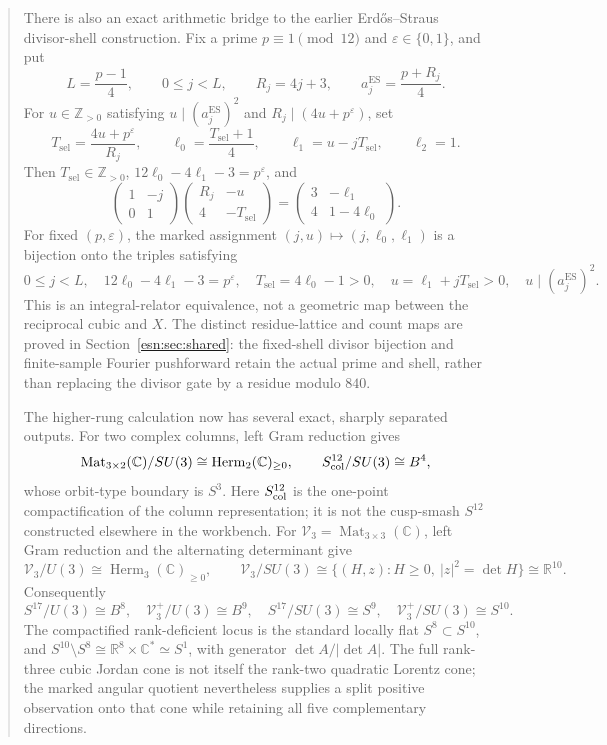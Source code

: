 \documentclass[11pt,letterpaper]{article}
\theoremstyle{definition}
\theoremstyle{remark}
\begin{document}
\begin{abstract}
 There is also an exact arithmetic bridge to the earlier
 Erd\H{o}s--Straus divisor-shell construction.  Fix a prime
 \(p\equiv1\pmod{12}\) and \(\varepsilon\in\{0,1\}\), and put
 \[
  L=\frac{p-1}{4},\qquad 0\leq j<L,\qquad R_j=4j+3,
  \qquad a_j^{\mathrm{ES}}=\frac{p+R_j}{4}.
 \]
 For \(u\in\mathbb Z_{>0}\) satisfying
 \(u\mid(a_j^{\mathrm{ES}})^2\) and
 \(R_j\mid(4u+p^\varepsilon)\), set
 \[
  T_{\mathrm{sel}}=\frac{4u+p^\varepsilon}{R_j},\qquad
  \ell_0=\frac{T_{\mathrm{sel}}+1}{4},\qquad
  \ell_1=u-jT_{\mathrm{sel}},\qquad \ell_2=1.
 \]
 Then \(T_{\mathrm{sel}}\in\mathbb Z_{>0}\),
 \(12\ell_0-4\ell_1-3=p^\varepsilon\), and
 \[
  \begin{pmatrix}1&-j\\0&1\end{pmatrix}
  \begin{pmatrix}R_j&-u\\4&-T_{\mathrm{sel}}\end{pmatrix}
  =\begin{pmatrix}3&-\ell_1\\4&1-4\ell_0\end{pmatrix}.
 \]
 For fixed \((p,\varepsilon)\), the marked assignment \((j,u)\mapsto
 (j,\ell_0,\ell_1)\) is a bijection onto the triples satisfying
 \[
  0\leq j<L,\quad12\ell_0-4\ell_1-3=p^\varepsilon,\quad
  T_{\mathrm{sel}}=4\ell_0-1>0,\quad
  u=\ell_1+jT_{\mathrm{sel}}>0,\quad
  u\mid(a_j^{\mathrm{ES}})^2.
 \]
 This is an integral-relator equivalence, not a geometric map between the
 reciprocal cubic and \(X\).
 The distinct residue-lattice and count maps are proved in
 Section~\ref{esn:sec:shared}: the fixed-shell divisor bijection and
 finite-sample Fourier pushforward retain the actual prime and shell,
 rather than replacing the divisor gate by a residue modulo $840$.

 The higher-rung calculation now has several exact, sharply separated outputs.
 For two complex columns, left Gram reduction gives
 \[
  \operatorname{Mat}_{3\times2}(\mathbb C)/SU(3)
  \cong\operatorname{Herm}_2(\mathbb C)_{\geq0},\qquad
  S^{12}_{\rm col}/SU(3)\cong B^4,
 \]
 whose orbit-type boundary is \(S^3\).  Here \(S^{12}_{\rm col}\) is the
 one-point compactification of the column representation; it is not the
 cusp-smash \(S^{12}\) constructed elsewhere in the workbench.
 For \(\mathscr V_3=\operatorname{Mat}_{3\times3}(\mathbb C)\), left Gram
 reduction and the alternating determinant give
 \[
  \mathscr V_3/U(3)\cong\operatorname{Herm}_3(\mathbb C)_{\geq0},
  \qquad
  \mathscr V_3/SU(3)
  \cong\{(H,z):H\geq0,\ |z|^2=\det H\}\cong\mathbb R^{10}.
 \]
 Consequently
 \[
  S^{17}/U(3)\cong B^8,\quad
  \mathscr V_3^+/U(3)\cong B^9,\quad
  S^{17}/SU(3)\cong S^9,\quad
  \mathscr V_3^+/SU(3)\cong S^{10}.
 \]
 The compactified rank-deficient locus is the standard locally flat
 \(S^8\subset S^{10}\), and
 \(S^{10}\setminus S^8\cong\mathbb R^8\times\mathbb C^*\simeq S^1\),
 with generator \(\det A/|\det A|\).  The full rank-three cubic Jordan cone
 is not itself the rank-two quadratic Lorentz cone; the marked angular
 quotient nevertheless supplies a split positive observation onto that cone
 while retaining all five complementary directions.


\end{abstract}
\end{document}
